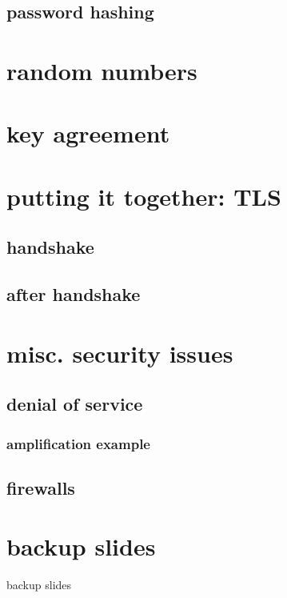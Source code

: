 

\subsection{password hashing}



\section{random numbers}


\section{key agreement}



\section{putting it together: TLS}

\subsection{handshake}


\subsection{after handshake}


\section{misc. security issues}

\subsection{denial of service}


\subsubsection{amplification example}

\subsection{firewalls} %



\section{backup slides}
\begin{frame}{backup slides}
\end{frame}

